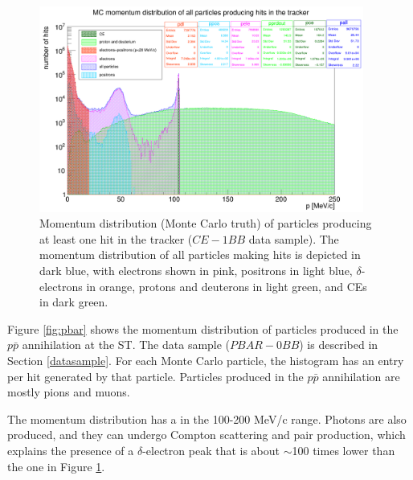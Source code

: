 \begin{figure}[!h]
        \centering
        \includegraphics[width =0.95\textwidth]{figures/png/Screenshot_20240812_152905.png}
    \caption[Monte Carlo momentum distribution 
    of particles producing hits in the Mu2e 
    tracker ($CE-1BB$ data sample).]{
        Momentum distribution (Monte Carlo truth)  
       of particles producing at 
       least one hit in the tracker 
       ($CE-1BB$ data sample).  
       The momentum distribution 
       of all particles making hits is 
       depicted in dark blue, with electrons 
       shown in pink, positrons in light 
       blue, $\delta$-electrons in orange, protons 
       and deuterons in 
       light green, and CEs in dark green. }
       \label{fig:momhits}
\end{figure}


Figure \ref{fig:pbar} shows the momentum distribution of 
particles produced in the $p\bar{p}$ annihilation at the ST. 
The data sample ($PBAR-0BB$) is described in Section \ref{datasample}.
For each Monte Carlo particle, the histogram 
has an entry per hit generated by that particle. 
Particles produced in the $p\bar{p}$ annihilation 
are mostly pions and muons.

The momentum distribution has a 
 in the 100-200 MeV/c range. Photons are also 
produced, and they can undergo Compton scattering and 
pair production, which explains the presence of a 
$\delta$-electron peak that is about $\sim$100 
times lower than the one in Figure \ref{fig:momhits}.

